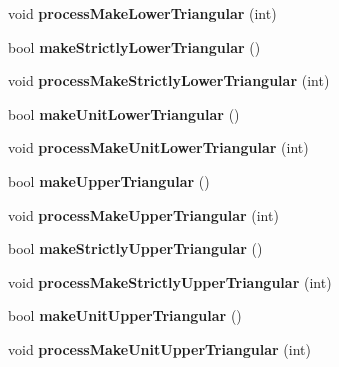 \begin{DoxyCompactItemize}
\item 
\hypertarget{classMatrix_a750b9ec00889e7df96424e9c326744fe}{void {\bfseries process\-Make\-Lower\-Triangular} (int)}\label{classMatrix_a750b9ec00889e7df96424e9c326744fe}

\item 
\hypertarget{classMatrix_af37d9b78d9c0709ca37f68d988c9a857}{bool {\bfseries make\-Strictly\-Lower\-Triangular} ()}\label{classMatrix_af37d9b78d9c0709ca37f68d988c9a857}

\item 
\hypertarget{classMatrix_a976dbc926b3ab1a1b9acff71e1416526}{void {\bfseries process\-Make\-Strictly\-Lower\-Triangular} (int)}\label{classMatrix_a976dbc926b3ab1a1b9acff71e1416526}

\item 
\hypertarget{classMatrix_ac26fef8d6ba46c279fdbb6a59f7d78ea}{bool {\bfseries make\-Unit\-Lower\-Triangular} ()}\label{classMatrix_ac26fef8d6ba46c279fdbb6a59f7d78ea}

\item 
\hypertarget{classMatrix_af0d41e018e7567b81fb921f311177b7c}{void {\bfseries process\-Make\-Unit\-Lower\-Triangular} (int)}\label{classMatrix_af0d41e018e7567b81fb921f311177b7c}

\item 
\hypertarget{classMatrix_ae727398c7b0480a70b41e0efd3a4fc7d}{bool {\bfseries make\-Upper\-Triangular} ()}\label{classMatrix_ae727398c7b0480a70b41e0efd3a4fc7d}

\item 
\hypertarget{classMatrix_aeb6a794c8e6cde5df40b7c48a1047ff0}{void {\bfseries process\-Make\-Upper\-Triangular} (int)}\label{classMatrix_aeb6a794c8e6cde5df40b7c48a1047ff0}

\item 
\hypertarget{classMatrix_ae68b682b69990481da559a19e07f8594}{bool {\bfseries make\-Strictly\-Upper\-Triangular} ()}\label{classMatrix_ae68b682b69990481da559a19e07f8594}

\item 
\hypertarget{classMatrix_acac419df969bd6cbfa2c30d21fb2c370}{void {\bfseries process\-Make\-Strictly\-Upper\-Triangular} (int)}\label{classMatrix_acac419df969bd6cbfa2c30d21fb2c370}

\item 
\hypertarget{classMatrix_a743cebef793d48a6d41bc0249062ace6}{bool {\bfseries make\-Unit\-Upper\-Triangular} ()}\label{classMatrix_a743cebef793d48a6d41bc0249062ace6}

\item 
\hypertarget{classMatrix_a079df0543b7a24ab8f74cf58dee2fb20}{void {\bfseries process\-Make\-Unit\-Upper\-Triangular} (int)}\label{classMatrix_a079df0543b7a24ab8f74cf58dee2fb20}


\end{DoxyCompactItemize}
